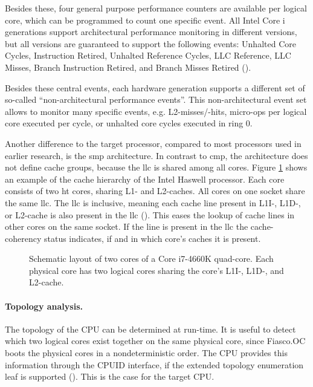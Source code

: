 Besides these, four general purpose performance counters are available per
logical core, which can be programmed to count one specific event.
All Intel Core i generations support architectural performance monitoring
in different versions, but all versions are guaranteed to support the following
events:
Unhalted Core Cycles, Instruction Retired, Unhalted Reference Cycles,
LLC Reference, LLC Misses, Branch Instruction Retired,
and Branch Misses Retired (\cite{intel_arch_ref_manual_2015}).

Besides these central events, each hardware generation supports a different set
of so-called ``non-architectural performance events''.
This non-architectural event set allows to monitor many specific events, e.g.
L2-misses/-hits, micro-ops per logical core executed per cycle, or unhalted
core cycles executed in ring 0.

Another difference to the target processor, compared to most processors used in
earlier research, is the \gls{smp} architecture.
In contrast to \gls{cmp}, the architecture does not define cache groups,
because the \gls{llc} is shared among all cores.
Figure \ref{state:fig:core_layout} shows an example of the cache hierarchy of
the Intel Haswell processor.
Each core consists of two \gls{ht} cores, sharing L1- and L2-caches.
All cores on one socket share the same \gls{llc}.
The \gls{llc} is inclusive, meaning each cache line present in L1I-, L1D-, or
L2-cache is also present in the \gls{llc}
(\autocite[2-23]{intel_optimization_manual_2015}).
This eases the lookup of cache lines in other cores on the same socket.
If the line is present in the \gls{llc} the cache-coherency status indicates,
if and in which core's caches it is present.


\begin{figure}[h!]
  \setcapindent*{1em}
  \setlength{\columnsep}{10mm}
  \begin{captionbeside}{Schematic layout of two cores of a Core i7-4660K quad-core.
    Each physical core has two logical cores sharing the core's L1I-,
    L1D-, and L2-cache.}
  
\end{captionbeside}
  \label{state:fig:core_layout}
\end{figure}

\paragraph{Topology analysis.}
The topology of the CPU can be determined at run-time.
It is useful to detect which two logical cores exist together on the same
physical core, since Fiasco.OC boots the physical cores in a nondeterministic order.
The CPU provides this information through the CPUID interface, if the
extended topology enumeration leaf is supported (\autocite[Vol.2A
3-179]{intel_arch_ref_manual_2015}). This is the case for the
target CPU.

